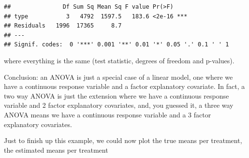\documentclass[
]{book}
\begin{document}
\begin{verbatim}
##               Df Sum Sq Mean Sq F value Pr(>F)    
## type           3   4792  1597.5   183.6 <2e-16 ***
## Residuals   1996  17365     8.7                   
## ---
## Signif. codes:  0 '***' 0.001 '**' 0.01 '*' 0.05 '.' 0.1 ' ' 1
\end{verbatim}

where everything is the same (test statistic, degrees of freedom and p-values).

Conclusion: an ANOVA is just a special case of a linear model, one where we have a continuous response variable and a factor explanatory covariate. In fact, a two way ANOVA is just the extension where we have a continuous response variable and 2 factor explanatory covariates, and, you guessed it, a three way ANOVA means we have a continuous response variable and a 3 factor explanatory covariates.

Just to finish up this example, we could now plot the true means per treatment, the estimated means per treatment
\end{document}
